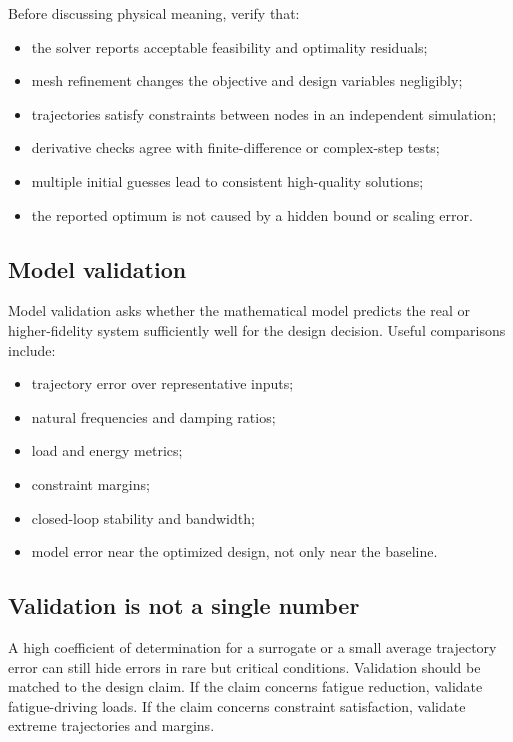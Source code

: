 \documentclass[11pt]{article}
\begin{document}
Before discussing physical meaning, verify that:
\begin{itemize}[leftmargin=1.4em]
  \item the solver reports acceptable feasibility and optimality residuals;
  \item mesh refinement changes the objective and design variables negligibly;
  \item trajectories satisfy constraints between nodes in an independent simulation;
  \item derivative checks agree with finite-difference or complex-step tests;
  \item multiple initial guesses lead to consistent high-quality solutions;
  \item the reported optimum is not caused by a hidden bound or scaling error.
\end{itemize}

\subsection{Model validation}

Model validation asks whether the mathematical model predicts the real or higher-fidelity system sufficiently well for the design decision. Useful comparisons include:
\begin{itemize}[leftmargin=1.4em]
  \item trajectory error over representative inputs;
  \item natural frequencies and damping ratios;
  \item load and energy metrics;
  \item constraint margins;
  \item closed-loop stability and bandwidth;
  \item model error near the optimized design, not only near the baseline.
\end{itemize}

\subsection{Validation is not a single number}

A high coefficient of determination for a surrogate or a small average trajectory error can still hide errors in rare but critical conditions. Validation should be matched to the design claim. If the claim concerns fatigue reduction, validate fatigue-driving loads. If the claim concerns constraint satisfaction, validate extreme trajectories and margins.
\end{document}
